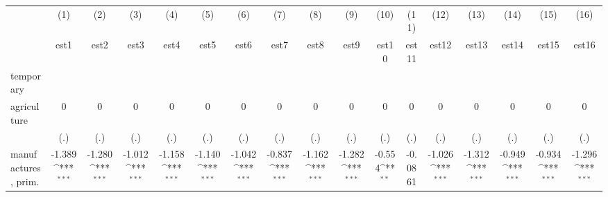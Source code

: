 {
\def\sym#1{\ifmmode^{#1}\else\(^{#1}\)\fi}
\begin{tabular}{l*{16}{c}}
\hline\hline
                    &\multicolumn{1}{c}{(1)}&\multicolumn{1}{c}{(2)}&\multicolumn{1}{c}{(3)}&\multicolumn{1}{c}{(4)}&\multicolumn{1}{c}{(5)}&\multicolumn{1}{c}{(6)}&\multicolumn{1}{c}{(7)}&\multicolumn{1}{c}{(8)}&\multicolumn{1}{c}{(9)}&\multicolumn{1}{c}{(10)}&\multicolumn{1}{c}{(11)}&\multicolumn{1}{c}{(12)}&\multicolumn{1}{c}{(13)}&\multicolumn{1}{c}{(14)}&\multicolumn{1}{c}{(15)}&\multicolumn{1}{c}{(16)}\\
                    &\multicolumn{1}{c}{est1}&\multicolumn{1}{c}{est2}&\multicolumn{1}{c}{est3}&\multicolumn{1}{c}{est4}&\multicolumn{1}{c}{est5}&\multicolumn{1}{c}{est6}&\multicolumn{1}{c}{est7}&\multicolumn{1}{c}{est8}&\multicolumn{1}{c}{est9}&\multicolumn{1}{c}{est10}&\multicolumn{1}{c}{est11}&\multicolumn{1}{c}{est12}&\multicolumn{1}{c}{est13}&\multicolumn{1}{c}{est14}&\multicolumn{1}{c}{est15}&\multicolumn{1}{c}{est16}\\
\hline
temporary           &                     &                     &                     &                     &                     &                     &                     &                     &                     &                     &                     &                     &                     &                     &                     &                     \\
agriculture         &           0         &           0         &           0         &           0         &           0         &           0         &           0         &           0         &           0         &           0         &           0         &           0         &           0         &           0         &           0         &           0         \\
                    &         (.)         &         (.)         &         (.)         &         (.)         &         (.)         &         (.)         &         (.)         &         (.)         &         (.)         &         (.)         &         (.)         &         (.)         &         (.)         &         (.)         &         (.)         &         (.)         \\
[1em]
manufactures, prim. &      -1.389\sym{***}&      -1.280\sym{***}&      -1.012\sym{***}&      -1.158\sym{***}&      -1.140\sym{***}&      -1.042\sym{***}&      -0.837\sym{***}&      -1.162\sym{***}&      -1.282\sym{***}&      -0.554\sym{**} &     -0.0861         &      -1.026\sym{***}&      -1.312\sym{***}&      -0.949\sym{***}&      -0.934\sym{***}&      -1.296\sym{***}\\

\end{tabular}}
